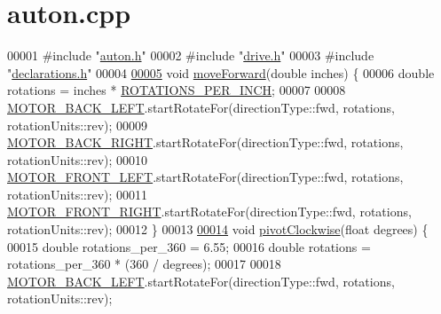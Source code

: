 \hypertarget{auton_8cpp_source}{}\section{auton.\+cpp}
\label{auton_8cpp_source}

\begin{DoxyCode}
00001 \textcolor{preprocessor}{#include "\mbox{\hyperlink{auton_8h}{auton.h}}"}
00002 \textcolor{preprocessor}{#include "\mbox{\hyperlink{drive_8h}{drive.h}}"}
00003 \textcolor{preprocessor}{#include "\mbox{\hyperlink{declarations_8h}{declarations.h}}"}
00004 
\mbox{\hyperlink{auton_8cpp_ac132ca53625938c26d9d9104ca5c9e82_ac132ca53625938c26d9d9104ca5c9e82}{00005}} \textcolor{keywordtype}{void} \mbox{\hyperlink{auton_8cpp_ac132ca53625938c26d9d9104ca5c9e82_ac132ca53625938c26d9d9104ca5c9e82}{moveForward}}(\textcolor{keywordtype}{double} inches) \{
00006   \textcolor{keywordtype}{double} rotations = inches * \mbox{\hyperlink{declarations_8h_acfdb8ffd7cd602577173adb1c9c0f330_acfdb8ffd7cd602577173adb1c9c0f330}{ROTATIONS\_PER\_INCH}};
00007 
00008   \mbox{\hyperlink{declarations_8h_ab24214b642128d0f3cb67e9b12e7d4fb_ab24214b642128d0f3cb67e9b12e7d4fb}{MOTOR\_BACK\_LEFT}}.startRotateFor(directionType::fwd, rotations, rotationUnits::rev);
00009   \mbox{\hyperlink{declarations_8h_adece81dedf91c2893ba42dc05135a575_adece81dedf91c2893ba42dc05135a575}{MOTOR\_BACK\_RIGHT}}.startRotateFor(directionType::fwd, rotations, rotationUnits::rev);
00010   \mbox{\hyperlink{declarations_8h_a8c6f6315caf1d81bf4d4d113d0f7bffc_a8c6f6315caf1d81bf4d4d113d0f7bffc}{MOTOR\_FRONT\_LEFT}}.startRotateFor(directionType::fwd, rotations, rotationUnits::rev);
00011   \mbox{\hyperlink{declarations_8h_ad6a9ea3d338421c5d709c32ae1aa42d8_ad6a9ea3d338421c5d709c32ae1aa42d8}{MOTOR\_FRONT\_RIGHT}}.startRotateFor(directionType::fwd, rotations, rotationUnits::rev);
00012 \}
00013 
\mbox{\hyperlink{auton_8cpp_a7c81bf7b683346af95d1ff72eb60619f_a7c81bf7b683346af95d1ff72eb60619f}{00014}} \textcolor{keywordtype}{void} \mbox{\hyperlink{auton_8cpp_a7c81bf7b683346af95d1ff72eb60619f_a7c81bf7b683346af95d1ff72eb60619f}{pivotClockwise}}(\textcolor{keywordtype}{float} degrees) \{
00015   \textcolor{keywordtype}{double} rotations\_per\_360 = 6.55;
00016   \textcolor{keywordtype}{double} rotations = rotations\_per\_360 * (360 / degrees);
00017 
00018   \mbox{\hyperlink{declarations_8h_ab24214b642128d0f3cb67e9b12e7d4fb_ab24214b642128d0f3cb67e9b12e7d4fb}{MOTOR\_BACK\_LEFT}}.startRotateFor(directionType::fwd, rotations, rotationUnits::rev);

\end{DoxyCode}
